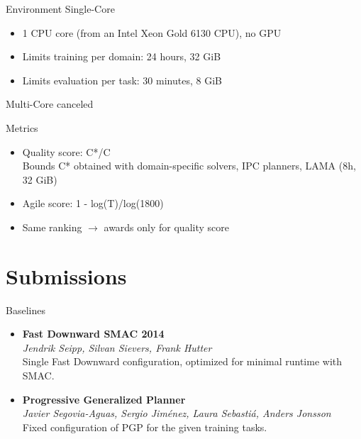 \documentclass[aspectratio=169,xcolor=dvipsnames]{beamer}
\begin{document}
\begin{frame}{Environment}
    Single-Core
    \begin{itemize}
        \item 1 CPU core (from an Intel Xeon Gold 6130 CPU), no GPU
        \item Limits \alert{training} per domain: 24 hours, 32 GiB
        \item Limits \alert{evaluation} per task: 30 minutes, 8 GiB
    \end{itemize}

    \bigskip
    Multi-Core canceled
\end{frame}

\begin{frame}{Metrics}
    \begin{itemize}
        \item Quality score: C*/C\\
        Bounds C* obtained with domain-specific solvers, IPC planners, LAMA (8h, 32 GiB)
        \item Agile score: 1 - log(T)/log(1800)
        \item Same ranking $\to$ awards only for quality score
    \end{itemize}
\end{frame}

\section{Submissions}

\begin{frame}{Baselines}
\begin{itemize}
\item
    \textbf{Fast Downward SMAC 2014}\\
    \emph{Jendrik Seipp, Silvan Sievers, Frank Hutter}\\
    Single Fast Downward
    configuration, optimized for minimal runtime with SMAC.
\item
    \textbf{Progressive Generalized Planner}\\
    \emph{Javier
    Segovia-Aguas, Sergio Jiménez, Laura Sebastiá, Anders Jonsson}\\
    Fixed configuration of PGP for the given training tasks.
\end{itemize}
\end{frame}
\end{document}
